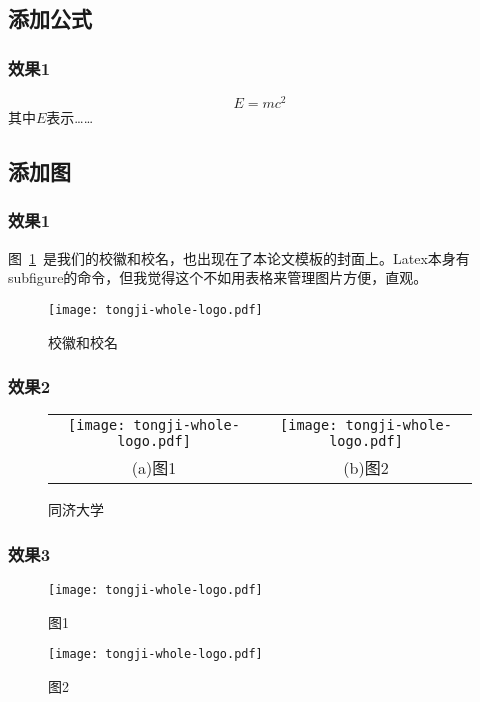 \subsection{添加公式}

\subsubsection{效果1}

\begin{equation}
  E = m c^2
\end{equation}
其中$E$表示……

\subsection{添加图}

\subsubsection{效果1}

图~\ref{fig:logo}~是我们的校徽和校名，也出现在了本论文模板的封面上。Latex本身有subfigure的命令，但我觉得这个不如用表格来管理图片方便，直观。

\begin{figure}[htb!]
  \centering
  \texttt{[image: tongji-whole-logo.pdf]}
  \caption{校徽和校名}
  \label{fig:logo}
\end{figure}

\subsubsection{效果2}

\begin{figure}[htb!] 
  \centering 
  \begin{tabular}{cc} 
    \texttt{[image: tongji-whole-logo.pdf]} & \texttt{[image: tongji-whole-logo.pdf]}\\ 
    (a)图1 & (b)图2
  \end{tabular} 
  \caption{同济大学} 
  \label{fig:subimage} 
\end{figure}

\subsubsection{效果3}

\begin{figure}[htb!] 
  \noindent 
  \begin{minipage}[t]{.48\linewidth} 
    \centering 
      \texttt{[image: tongji-whole-logo.pdf]} 
    \caption{图1} 
    \label{fig:quadratic} 
  \end{minipage} 
  \begin{minipage}[t]{.48\linewidth} 
    \centering 
    \texttt{[image: tongji-whole-logo.pdf]} 
      \caption{图2} 
    \label{fig:triorder} 
  \end{minipage} 
\end{figure}

